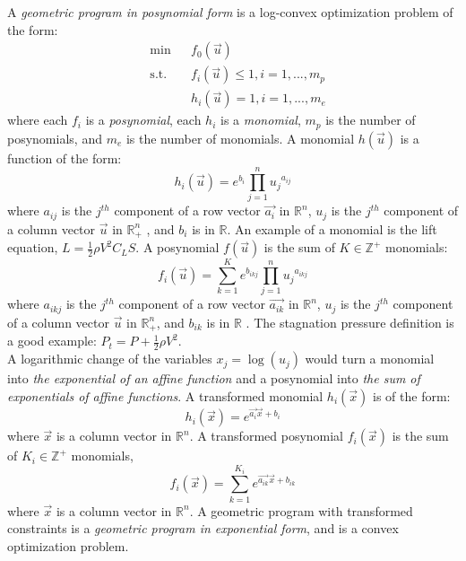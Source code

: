 A \emph{geometric program in posynomial form} is a log-convex optimization problem of the form:
\begin{equation}
\begin{aligned}
	& \text{min} && f_0 \left(\vec{u}\right) \\
	& \text{s.t.} && f_i \left(\vec{u}\right) \leq 1, i = 1,...,m_p\\
	& && h_i \left(\vec{u}\right) = 1, i = 1, ...,m_e
\end{aligned}
\label{GP_standard}
\end{equation}
where each $f_i$ is a {\em posynomial}, each $h_i$ is a {\em monomial}, $m_p$ is the number of posynomials,
and $m_e$ is the number of monomials. A monomial $h(\vec{u})$ is a function of the form:
\begin{equation}
	h_i(\vec{u}) = e^{b_i}\textstyle{\prod}_{j=1}^{n}{u_j}^{a_{ij}}
\end{equation}
where $a_{ij}$ is the $j^{th}$ component of a row vector $\vec{a_i}$ in $\mathbb{R}^n$,
$u_j$ is the $j^{th}$ component of a column vector $\vec{u}$ in $\mathbb{R}^n_+$ ,
and $b_i$ is in $\mathbb{R}$. An example of a monomial is the lift equation,
$L = \frac{1}{2}\rho V^2 C_L S$. A posynomial $f(\vec{u})$ is the sum of $K \in \mathbb{Z}^+$ monomials:
\begin{equation}
	f_i(\vec{u}) = \textstyle{\sum_{k=1}^{K}}e^{b_{ikj}}\prod_{j=1}^{n}{u_j}^{a_{ikj}}
\end{equation}
where $a_{ikj}$ is the $j^{th}$ component of a row vector $\vec{a_{ik}}$ in $\mathbb{R}^n$,
$u_j$ is the $j^{th}$ component of a column vector $\vec{u}$ in $\mathbb{R}^n_+$, and $b_{ik}$
is in $\mathbb{R}$ \cite{Boyd2007}. The stagnation pressure definition is a good example:
$P_t = P + \frac{1}{2} \rho V^2$.\\

A logarithmic change of the variables $x_j = \log(u_j)$ would turn a monomial into
{\em  the exponential of an affine function} and a posynomial into
{\em the sum of exponentials of affine functions}. A transformed monomial $h_i(\vec{x})$ is of the form:
\begin{equation}
    h_i(\vec{x}) = e^{\vec{a_i}\vec{x} + b_i}
\end{equation}
where $\vec{x}$ is a column vector in $\mathbb{R}^n$.
A transformed posynomial $f_i(\vec{x})$ is the sum of $K_i \in \mathbb{Z}^+$ monomials,
\begin{equation}
    f_i(\vec{x}) = \textstyle{\sum_{k=1}^{K_i}}e^{\vec{a_{ik}}\vec{x} + b_{ik}}
\end{equation}
where $\vec{x}$ is a column vector in $\mathbb{R}^n$.
A geometric program with transformed constraints is a \emph{geometric program in exponential form}, and
is a convex optimization problem.

